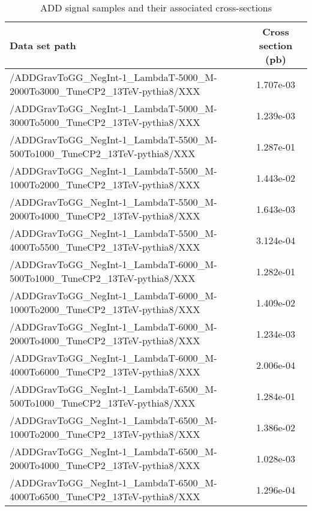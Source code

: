 \begin{landscape}
\begin{table}[!htbp]
       \caption{ ADD signal samples and their associated cross-sections }
       \centering
       \vspace{\baselineskip}
       \begin{tabular}{lc}
       \hline \hline
       Data set path & Cross section (pb)\\
       \hline


       /ADDGravToGG\_NegInt-1\_LambdaT-5000\_M-2000To3000\_TuneCP2\_13TeV-pythia8/XXX &  1.707e-03\\
       /ADDGravToGG\_NegInt-1\_LambdaT-5000\_M-3000To5000\_TuneCP2\_13TeV-pythia8/XXX &  1.239e-03\\
       /ADDGravToGG\_NegInt-1\_LambdaT-5500\_M-500To1000\_TuneCP2\_13TeV-pythia8/XXX &  1.287e-01\\
       /ADDGravToGG\_NegInt-1\_LambdaT-5500\_M-1000To2000\_TuneCP2\_13TeV-pythia8/XXX &  1.443e-02\\
       /ADDGravToGG\_NegInt-1\_LambdaT-5500\_M-2000To4000\_TuneCP2\_13TeV-pythia8/XXX &  1.643e-03\\
       /ADDGravToGG\_NegInt-1\_LambdaT-5500\_M-4000To5500\_TuneCP2\_13TeV-pythia8/XXX &  3.124e-04\\
       /ADDGravToGG\_NegInt-1\_LambdaT-6000\_M-500To1000\_TuneCP2\_13TeV-pythia8/XXX &  1.282e-01\\
       /ADDGravToGG\_NegInt-1\_LambdaT-6000\_M-1000To2000\_TuneCP2\_13TeV-pythia8/XXX &  1.409e-02\\
       /ADDGravToGG\_NegInt-1\_LambdaT-6000\_M-2000To4000\_TuneCP2\_13TeV-pythia8/XXX &  1.234e-03\\
       /ADDGravToGG\_NegInt-1\_LambdaT-6000\_M-4000To6000\_TuneCP2\_13TeV-pythia8/XXX &  2.006e-04\\
       /ADDGravToGG\_NegInt-1\_LambdaT-6500\_M-500To1000\_TuneCP2\_13TeV-pythia8/XXX &  1.284e-01\\
       /ADDGravToGG\_NegInt-1\_LambdaT-6500\_M-1000To2000\_TuneCP2\_13TeV-pythia8/XXX &  1.386e-02\\
       /ADDGravToGG\_NegInt-1\_LambdaT-6500\_M-2000To4000\_TuneCP2\_13TeV-pythia8/XXX &  1.028e-03\\
       /ADDGravToGG\_NegInt-1\_LambdaT-6500\_M-4000To6500\_TuneCP2\_13TeV-pythia8/XXX &  1.296e-04\\


       \hline \hline
       \end{tabular}
       \label{table:ADD_signal_samples_xsec}
\end{table}
\end{landscape}


